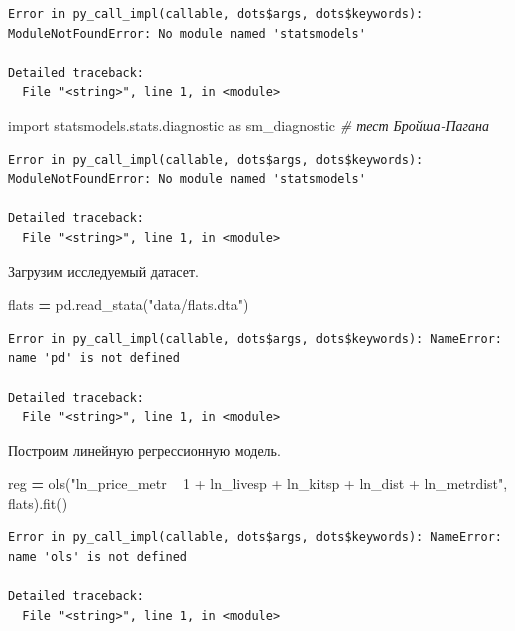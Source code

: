 \documentclass[]{book}
\newenvironment{Shaded}{\begin{snugshade}}{\end{snugshade}}
\newcommand{\CommentTok}[1]{\textcolor[rgb]{0.56,0.35,0.01}{\textit{#1}}}
\newcommand{\ImportTok}[1]{#1}
\newcommand{\NormalTok}[1]{#1}
\newcommand{\OperatorTok}[1]{\textcolor[rgb]{0.81,0.36,0.00}{\textbf{#1}}}
\newcommand{\StringTok}[1]{\textcolor[rgb]{0.31,0.60,0.02}{#1}}
\begin{document}
\begin{verbatim}
Error in py_call_impl(callable, dots$args, dots$keywords): ModuleNotFoundError: No module named 'statsmodels'

Detailed traceback: 
  File "<string>", line 1, in <module>
\end{verbatim}

\begin{Shaded}
\begin{Highlighting}[]
\ImportTok{import}\NormalTok{ statsmodels.stats.diagnostic }\ImportTok{as}\NormalTok{ sm_diagnostic }\CommentTok{# тест Бройша-Пагана}
\end{Highlighting}
\end{Shaded}

\begin{verbatim}
Error in py_call_impl(callable, dots$args, dots$keywords): ModuleNotFoundError: No module named 'statsmodels'

Detailed traceback: 
  File "<string>", line 1, in <module>
\end{verbatim}

Загрузим исследуемый датасет.

\begin{Shaded}
\begin{Highlighting}[]
\NormalTok{flats }\OperatorTok{=}\NormalTok{ pd.read_stata(}\StringTok{"data/flats.dta"}\NormalTok{)}
\end{Highlighting}
\end{Shaded}

\begin{verbatim}
Error in py_call_impl(callable, dots$args, dots$keywords): NameError: name 'pd' is not defined

Detailed traceback: 
  File "<string>", line 1, in <module>
\end{verbatim}

Построим линейную регрессионную модель.

\begin{Shaded}
\begin{Highlighting}[]
\NormalTok{reg }\OperatorTok{=}\NormalTok{ ols(}\StringTok{"ln_price_metr ~ 1 + ln_livesp + ln_kitsp + ln_dist + ln_metrdist"}\NormalTok{, flats).fit()}
\end{Highlighting}
\end{Shaded}

\begin{verbatim}
Error in py_call_impl(callable, dots$args, dots$keywords): NameError: name 'ols' is not defined

Detailed traceback: 
  File "<string>", line 1, in <module>
\end{verbatim}
\end{document}
